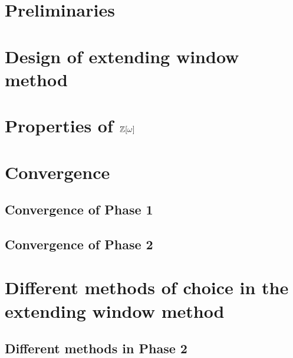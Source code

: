 \documentclass[11pt,a4paper]{report}	%
\theoremstyle{definition}
\begin{document}
\tableofcontents



\chapter{Preliminaries}
	




\chapter{Design of extending window method}
	

\chapter{\texorpdfstring{Properties of $\mathbb{Z}[\omega]$}{Properties of Z[omega]}}
	
	
		
	
\chapter{Convergence}
\label{chap:convergence}

	\section{Convergence of Phase 1}
	

	\section{Convergence of Phase 2}
	
	

	


\chapter{Different methods of choice in the extending window method}
	\label{chap:diffChoices}

	
	\section{Different methods in Phase 2}
	
\end{document}
